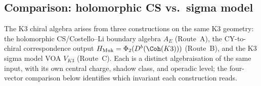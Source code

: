 
\subsection{Comparison: holomorphic CS vs.\ sigma model}
\label{subsec:hcs-vs-sigma-adversarial}

The K3 chiral algebra arises from three constructions on the same K3 geometry: the holomorphic CS/Costello--Li boundary algebra $A_E$ (Route~A), the CY-to-chiral correspondence output $H_{\mathrm{Muk}} = \Phi_2(D^b(\Coh(K3)))$ (Route~B), and the K3 sigma model VOA $V_{K3}$ (Route~C). Each is a distinct algebraisation of the same input, with its own central charge, shadow class, and operadic level; the four-vector comparison below identifies which invariant each construction reads.

